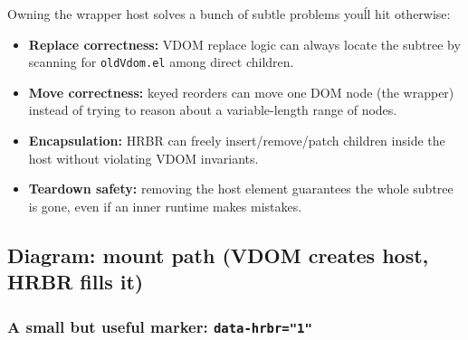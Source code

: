 Owning the wrapper host solves a bunch of subtle problems you\'ll hit otherwise:

\begin{itemize}
\item \textbf{Replace correctness:} VDOM replace logic can always locate the subtree by scanning for \texttt{oldVdom.el} among direct children.
\item \textbf{Move correctness:} keyed reorders can move one DOM node (the wrapper) instead of trying to reason about a variable-length range of nodes.
\item \textbf{Encapsulation:} HRBR can freely insert/remove/patch children inside the host without violating VDOM invariants.
\item \textbf{Teardown safety:} removing the host element guarantees the whole subtree is gone, even if an inner runtime makes mistakes.
\end{itemize}

\subsection*{Diagram: mount path (VDOM creates host, HRBR fills it)}
\begin{center}
\end{center}

\subsubsection{A small but useful marker: \texttt{data-hrbr="1"}}

